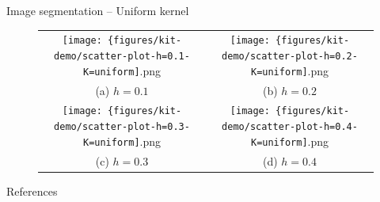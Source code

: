 \documentclass[18pt]{beamer}
\begin{document}
\begin{frame}{Image segmentation -- Uniform kernel}
\tiny
\begin{figure}
\begin{tabular}{cc}
\texttt{[image: \{figures/kit-demo/scatter-plot-h=0.1-K=uniform]}.png} &   \texttt{[image: \{figures/kit-demo/scatter-plot-h=0.2-K=uniform]}.png} \\
(a) $h = 0.1$ & (b) $h = 0.2$ \\[6pt]
\texttt{[image: \{figures/kit-demo/scatter-plot-h=0.3-K=uniform]}.png} &   \texttt{[image: \{figures/kit-demo/scatter-plot-h=0.4-K=uniform]}.png} \\
(c) $h = 0.3$ & (d) $h = 0.4$ \\[6pt]
\end{tabular}
\end{figure}
\end{frame}





\appendix
\beginbackup

\begin{frame}[allowframebreaks]{References}
	
	
	
\end{frame}

\begin{frame}
	\listoffigures
\end{frame}

\backupend
\end{document}
